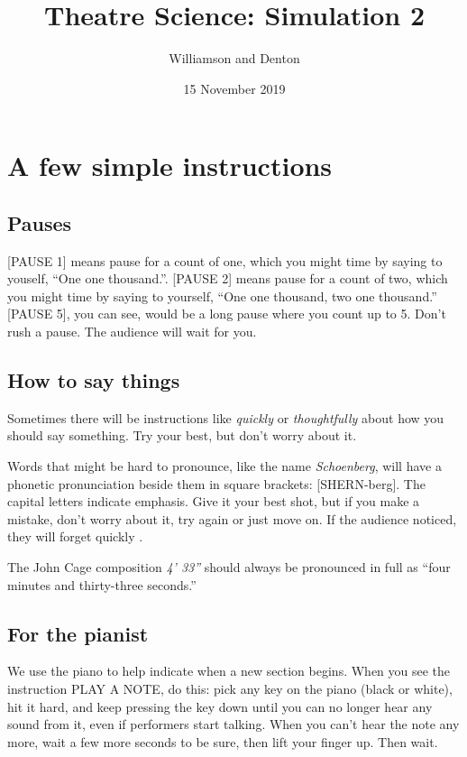 \documentclass[17pt]{extarticle}
\title{Theatre Science: Simulation 2}
\author{Williamson and Denton}
\date{15 November 2019}
\begin{document}
\maketitle

\section*{A few simple instructions}

\subsection*{Pauses}

[PAUSE 1] means pause for a count of one, which you might time by saying to youself, ``One one thousand.''.  [PAUSE 2] means pause for a count of two, which you might time by saying to yourself, ``One one thousand, two one thousand.''  [PAUSE 5], you can see, would be a long pause where you count up to 5.  Don't rush a pause.  The audience will wait for you.

\subsection*{How to say things}

Sometimes there will be instructions like \textit{quickly} or \textit{thoughtfully} about how you should say something.  Try your best, but don't worry about it.

Words that might be hard to pronounce, like the name \textit{Schoenberg}, will have a phonetic pronunciation beside them in square brackets: [SHERN-berg].  The capital letters indicate emphasis.  Give it your best shot, but if you make a mistake, don't worry about it, try again or just move on.  If the audience noticed, they will forget quickly .

The John Cage composition \textit{4' 33''} should always be pronounced in full as ``four minutes and thirty-three seconds.''

\subsection*{For the pianist}

We use the piano to help indicate when a new section begins.  When you see the instruction PLAY A NOTE, do this:  pick any key on the piano (black or white), hit it hard, and keep pressing the key down until you can no longer hear any sound from it, even if performers start talking.  When you can't hear the note any more, wait a few more seconds to be sure, then lift your finger up.  Then wait.
\end{document}
